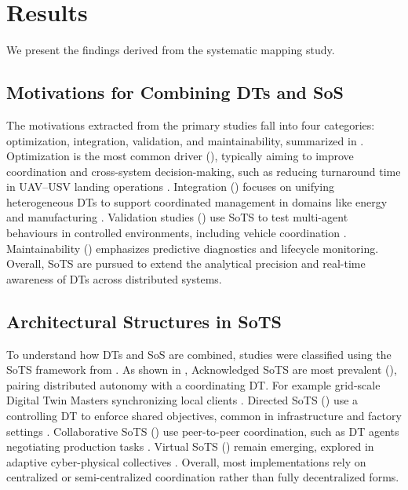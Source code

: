 \section{Results}\label{sec:literature-review-results}
We present the findings derived from the systematic mapping study.

\subsection{Motivations for Combining DTs and SoS}\label{subsec:literature-review-results-motivations}
The motivations extracted from the primary studies fall into four categories: optimization, integration, validation, and maintainability, summarized in . Optimization is the most common driver (), typically aiming to improve coordination and cross-system decision-making, such as reducing turnaround time in UAV–USV landing operations \cite{li2022cognitive}. Integration () focuses on unifying heterogeneous DTs to support coordinated management in domains like energy and manufacturing \cite{monsalve2021novel}. Validation studies () use SoTS to test multi-agent behaviours in controlled environments, including vehicle coordination \cite{dahmen2022modeling}. Maintainability () emphasizes predictive diagnostics and lifecycle monitoring. Overall, SoTS are pursued to extend the analytical precision and real-time awareness of DTs across distributed systems.



\subsection{Architectural Structures in SoTS}\label{subsec:literature-review-results-architecture}
To understand how DTs and SoS are combined, studies were classified using the SoTS framework from . As shown in , Acknowledged SoTS are most prevalent (), pairing distributed autonomy with a coordinating DT. For example grid-scale Digital Twin Masters synchronizing local clients \cite{monsalve2021novel}. Directed SoTS () use a controlling DT to enforce shared objectives, common in infrastructure and factory settings \cite{reiche2021digital, li2024comprehensive}. Collaborative SoTS () use peer-to-peer coordination, such as DT agents negotiating production tasks \cite{vogel-heuser2021approach}. Virtual SoTS () remain emerging, explored in adaptive cyber-physical collectives \cite{esterle2021digital}. Overall, most implementations rely on centralized or semi-centralized coordination rather than fully decentralized forms.

